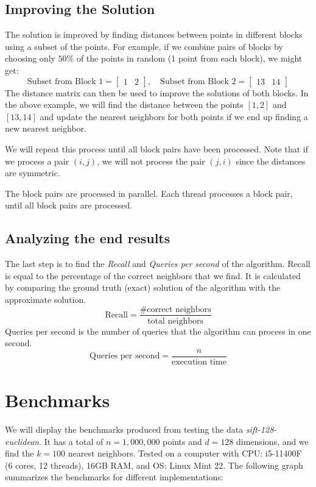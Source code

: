 \documentclass{article}
\begin{document}
\subsection{Improving the Solution}
The solution is improved by finding distances between points in different blocks using a subset of the points. 
For example, if we combine pairs of blocks by choosing only $50\%$ of the points in random (1 point from each block),
we might get:
\[
\text{Subset from Block 1} = \begin{bmatrix}
1 & 2
\end{bmatrix}, \quad
\text{Subset from Block 2} = \begin{bmatrix}
13 & 14
\end{bmatrix}
\]
The distance matrix can then be used to improve the solutions of both blocks. In the above example, we will find the
distance between the points $[1, 2]$ and $[13, 14]$ and update the nearest neighbors for both points if we end up finding a new
nearest neighbor.

We will repeat this process until all block pairs have been processed. Note that if we process a pair $(i, j)$, we will 
not process the pair $(j, i)$ since the distances are symmetric.

The block pairs are processed in parallel. Each thread processes a block pair, until all block pairs are processed.

\subsection{Analyzing the end results}
The last step is to find the \emph{Recall} and \emph{Queries per second} of the algorithm. Recall is equal to the percentage of the
correct neighbors that we find. It is calculated by comparing the ground truth (exact) solution of the algorithm with the 
approximate solution.
\[
\text{Recall} = \frac{\text{\# correct neighbors}}{\text{total neighbors}}
\]
Queries per second is the number of queries that the algorithm can process in one second. 
\[
\text{Queries per second} = \frac{n}{\text{execution time}}
\]


\section{Benchmarks}
We will display the benchmarks produced from testing the data \emph{sift-128-euclidean}.
It has a total of $n=1,000,000$ points and $d=128$ dimensions, and we find the $k=100$ nearest neighbors.
Tested on a computer with CPU: i5-11400F (6 cores, 12 threads), 16GB RAM, and OS: Linux Mint 22.
The following graph summarizes the benchmarks for different implementations:
\end{document}
